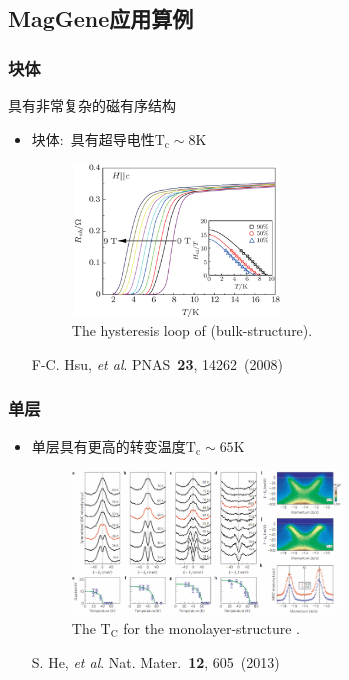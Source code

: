 \documentclass[cjk,slidestop,compress,mathserif,blue]{beamer}
\begin{document}
\subsection{\rm{MagGene}应用算例}
\frame
{
	\frametitle{块体\textrm{}}
	\textrm{}具有非常复杂的磁有序结构
	\begin{itemize}
		\item 块体\textrm{}:~具有超导电性$\mathrm{T_c}\sim8\mathrm{K}$
\begin{figure}[h!]
\centering
\includegraphics[height=1.6in,width=2.20in]{Figures/FeSe-Mag-Tc.png}
\caption{\tiny \textrm{The hysteresis loop of  (bulk-structure). }}%
\label{Fig:Mag-bulk-FeSe}
\end{figure}
\textrm{F-C. Hsu, \textit{et al}. PNAS \textbf{23}, 14262~(2008)}
	\end{itemize}
}

\frame
{
	\frametitle{单层\textrm{}}
	\begin{itemize}
		\item 单层\textrm{}具有更高的转变温度$\mathrm{T_c}\sim65\mathrm{K}$
\begin{figure}[h!]
\vspace*{-0.08in}
\centering
\includegraphics[height=1.5in,width=2.80in]{Figures/FeSe-single-Mag-Tc.png}
\caption{\tiny \textrm{The  $\mathrm{T_C}$ for the monolayer-structure .}}%
\label{Fig:Mag-surface-FeSe}
\end{figure}
\textrm{S. He, \textit{et al}.  Nat. Mater. \textbf{12}, 605~(2013)}
	\end{itemize}
}
\end{document}
